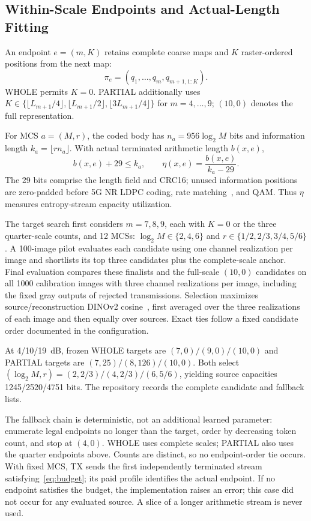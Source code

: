 \subsection{Within-Scale Endpoints and Actual-Length Fitting}
An endpoint $e=(m,K)$ retains complete coarse maps and $K$ raster-ordered positions from the next map:
\begin{equation}
 \pi_e=(q_1,\ldots,q_m,q_{m+1,1:K}).
 \label{eq:prefix}
\end{equation}
WHOLE permits $K=0$. PARTIAL additionally uses
$K\in\{\lfloor L_{m+1}/4\rfloor,\lfloor L_{m+1}/2\rfloor,\lfloor3L_{m+1}/4\rfloor\}$ for $m=4,\ldots,9$; $(10,0)$ denotes the full representation.

For MCS $a=(M,r)$, the coded body has $n_a=956\log_2M$ bits and information length $k_a=\lfloor rn_a\rfloor$. With actual terminated arithmetic length $b(x,e)$,
\begin{equation}
 b(x,e)+29\leq k_a,\qquad \eta(x,e)=\frac{b(x,e)}{k_a-29}.
 \label{eq:budget}
\end{equation}
The 29 bits comprise the length field and CRC16; unused information positions are zero-padded before 5G NR LDPC coding, rate matching~\cite{nr}, and QAM. Thus $\eta$ measures entropy-stream capacity utilization.

The target search first considers $m=7,8,9$, each with $K=0$ or the three quarter-scale counts, and 12 MCSs: $\log_2M\in\{2,4,6\}$ and $r\in\{1/2,2/3,3/4,5/6\}$. A 100-image pilot evaluates each candidate using one channel realization per image and shortlists its top three candidates plus the complete-scale anchor. Final evaluation compares these finalists and the full-scale $(10,0)$ candidates on all 1000 calibration images with three channel realizations per image, including the fixed gray outputs of rejected transmissions. Selection maximizes source/reconstruction DINOv2 cosine~\cite{dinov2}, first averaged over the three realizations of each image and then equally over sources. Exact ties follow a fixed candidate order documented in the configuration.

At 4/10/19~dB, frozen WHOLE targets are $(7,0)/(9,0)/(10,0)$ and PARTIAL targets are $(7,25)/(8,126)/(10,0)$. Both select $(\log_2M,r)=(2,2/3)/(4,2/3)/(6,5/6)$, yielding source capacities 1245/2520/4751 bits. The repository records the complete candidate and fallback lists.

The fallback chain is deterministic, not an additional learned parameter: enumerate legal endpoints no longer than the target, order by decreasing token count, and stop at $(4,0)$. WHOLE uses complete scales; PARTIAL also uses the quarter endpoints above. Counts are distinct, so no endpoint-order tie occurs. With fixed MCS, TX sends the first independently terminated stream satisfying~\eqref{eq:budget}; its paid profile identifies the actual endpoint. If no endpoint satisfies the budget, the implementation raises an error; this case did not occur for any evaluated source. A slice of a longer arithmetic stream is never used.

